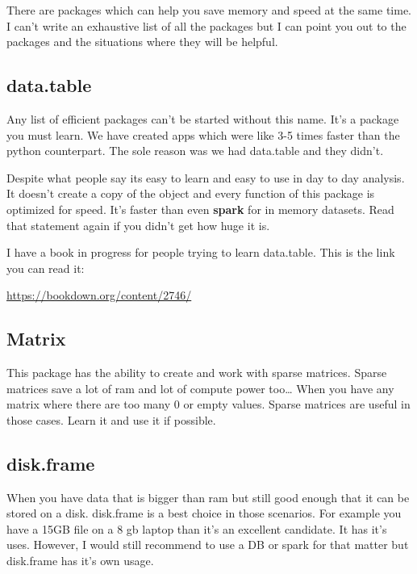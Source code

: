 \documentclass[
]{book}
\begin{document}
There are packages which can help you save memory and speed at the same time. I can't write an exhaustive list of all the packages but I can point you out to the packages and the situations where they will be helpful.

\hypertarget{data.table}{%
\subsection{data.table}\label{data.table}}

Any list of efficient packages can't be started without this name. It's a package you must learn. We have created apps which were like 3-5 times faster than the python counterpart. The sole reason was we had data.table and they didn't.

Despite what people say its easy to learn and easy to use in day to day analysis. It doesn't create a copy of the object and every function of this package is optimized for speed. It's faster than even \textbf{spark} for in memory datasets. Read that statement again if you didn't get how huge it is.

I have a book in progress for people trying to learn data.table. This is the link you can read it:

\url{https://bookdown.org/content/2746/}

\hypertarget{matrix}{%
\subsection{Matrix}\label{matrix}}

This package has the ability to create and work with sparse matrices. Sparse matrices save a lot of ram and lot of compute power too\ldots{} When you have any matrix where there are too many 0 or empty values. Sparse matrices are useful in those cases. Learn it and use it if possible.

\hypertarget{disk.frame}{%
\subsection{disk.frame}\label{disk.frame}}

When you have data that is bigger than ram but still good enough that it can be stored on a disk. disk.frame is a best choice in those scenarios. For example you have a 15GB file on a 8 gb laptop than it's an excellent candidate. It has it's uses. However, I would still recommend to use a DB or spark for that matter but disk.frame has it's own usage.
\end{document}
